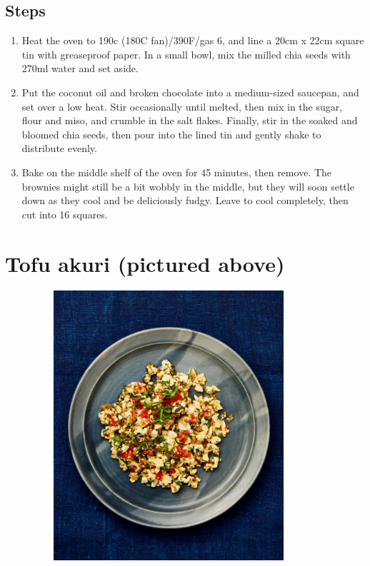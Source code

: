\documentclass{book}
\begin{document}
\subsection*{Steps}
\begin{enumerate}
\item Heat the oven to 190c (180C fan)/390F/gas 6, and line a 20cm x 22cm square tin with greaseproof paper. In a small bowl, mix the milled chia seeds with 270ml water and set aside.
\item Put the coconut oil and broken chocolate into a medium-sized saucepan, and set over a low heat. Stir occasionally until melted, then mix in the sugar, flour and miso, and crumble in the salt flakes. Finally, stir in the soaked and bloomed chia seeds, then pour into the lined tin and gently shake to distribute evenly.
\item Bake on the middle shelf of the oven for 45 minutes, then remove. The brownies might still be a bit wobbly in the middle, but they will soon settle down as they cool and be deliciously fudgy. Leave to cool completely, then cut into 16 squares.
\end{enumerate}
\newpage

\section{Tofu akuri (pictured above)}
\begin{figure}
\centering\includegraphics[width=10cm,height=10cm,keepaspectratio]{Recipe_Pictures/Tofu_akuri_(pictured_above).png}
\end{figure}
\emph{}\\\\ 
\end{document}
